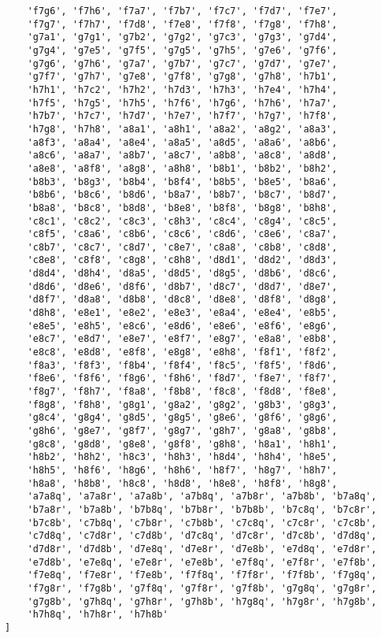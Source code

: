\begin{verbatim}
    'f7g6', 'f7h6', 'f7a7', 'f7b7', 'f7c7', 'f7d7', 'f7e7',
    'f7g7', 'f7h7', 'f7d8', 'f7e8', 'f7f8', 'f7g8', 'f7h8',
    'g7a1', 'g7g1', 'g7b2', 'g7g2', 'g7c3', 'g7g3', 'g7d4',
    'g7g4', 'g7e5', 'g7f5', 'g7g5', 'g7h5', 'g7e6', 'g7f6',
    'g7g6', 'g7h6', 'g7a7', 'g7b7', 'g7c7', 'g7d7', 'g7e7',
    'g7f7', 'g7h7', 'g7e8', 'g7f8', 'g7g8', 'g7h8', 'h7b1',
    'h7h1', 'h7c2', 'h7h2', 'h7d3', 'h7h3', 'h7e4', 'h7h4',
    'h7f5', 'h7g5', 'h7h5', 'h7f6', 'h7g6', 'h7h6', 'h7a7',
    'h7b7', 'h7c7', 'h7d7', 'h7e7', 'h7f7', 'h7g7', 'h7f8',
    'h7g8', 'h7h8', 'a8a1', 'a8h1', 'a8a2', 'a8g2', 'a8a3',
    'a8f3', 'a8a4', 'a8e4', 'a8a5', 'a8d5', 'a8a6', 'a8b6',
    'a8c6', 'a8a7', 'a8b7', 'a8c7', 'a8b8', 'a8c8', 'a8d8',
    'a8e8', 'a8f8', 'a8g8', 'a8h8', 'b8b1', 'b8b2', 'b8h2',
    'b8b3', 'b8g3', 'b8b4', 'b8f4', 'b8b5', 'b8e5', 'b8a6',
    'b8b6', 'b8c6', 'b8d6', 'b8a7', 'b8b7', 'b8c7', 'b8d7',
    'b8a8', 'b8c8', 'b8d8', 'b8e8', 'b8f8', 'b8g8', 'b8h8',
    'c8c1', 'c8c2', 'c8c3', 'c8h3', 'c8c4', 'c8g4', 'c8c5',
    'c8f5', 'c8a6', 'c8b6', 'c8c6', 'c8d6', 'c8e6', 'c8a7',
    'c8b7', 'c8c7', 'c8d7', 'c8e7', 'c8a8', 'c8b8', 'c8d8',
    'c8e8', 'c8f8', 'c8g8', 'c8h8', 'd8d1', 'd8d2', 'd8d3',
    'd8d4', 'd8h4', 'd8a5', 'd8d5', 'd8g5', 'd8b6', 'd8c6',
    'd8d6', 'd8e6', 'd8f6', 'd8b7', 'd8c7', 'd8d7', 'd8e7',
    'd8f7', 'd8a8', 'd8b8', 'd8c8', 'd8e8', 'd8f8', 'd8g8',
    'd8h8', 'e8e1', 'e8e2', 'e8e3', 'e8a4', 'e8e4', 'e8b5',
    'e8e5', 'e8h5', 'e8c6', 'e8d6', 'e8e6', 'e8f6', 'e8g6',
    'e8c7', 'e8d7', 'e8e7', 'e8f7', 'e8g7', 'e8a8', 'e8b8',
    'e8c8', 'e8d8', 'e8f8', 'e8g8', 'e8h8', 'f8f1', 'f8f2',
    'f8a3', 'f8f3', 'f8b4', 'f8f4', 'f8c5', 'f8f5', 'f8d6',
    'f8e6', 'f8f6', 'f8g6', 'f8h6', 'f8d7', 'f8e7', 'f8f7',
    'f8g7', 'f8h7', 'f8a8', 'f8b8', 'f8c8', 'f8d8', 'f8e8',
    'f8g8', 'f8h8', 'g8g1', 'g8a2', 'g8g2', 'g8b3', 'g8g3',
    'g8c4', 'g8g4', 'g8d5', 'g8g5', 'g8e6', 'g8f6', 'g8g6',
    'g8h6', 'g8e7', 'g8f7', 'g8g7', 'g8h7', 'g8a8', 'g8b8',
    'g8c8', 'g8d8', 'g8e8', 'g8f8', 'g8h8', 'h8a1', 'h8h1',
    'h8b2', 'h8h2', 'h8c3', 'h8h3', 'h8d4', 'h8h4', 'h8e5',
    'h8h5', 'h8f6', 'h8g6', 'h8h6', 'h8f7', 'h8g7', 'h8h7',
    'h8a8', 'h8b8', 'h8c8', 'h8d8', 'h8e8', 'h8f8', 'h8g8',
    'a7a8q', 'a7a8r', 'a7a8b', 'a7b8q', 'a7b8r', 'a7b8b', 'b7a8q',
    'b7a8r', 'b7a8b', 'b7b8q', 'b7b8r', 'b7b8b', 'b7c8q', 'b7c8r',
    'b7c8b', 'c7b8q', 'c7b8r', 'c7b8b', 'c7c8q', 'c7c8r', 'c7c8b',
    'c7d8q', 'c7d8r', 'c7d8b', 'd7c8q', 'd7c8r', 'd7c8b', 'd7d8q',
    'd7d8r', 'd7d8b', 'd7e8q', 'd7e8r', 'd7e8b', 'e7d8q', 'e7d8r',
    'e7d8b', 'e7e8q', 'e7e8r', 'e7e8b', 'e7f8q', 'e7f8r', 'e7f8b',
    'f7e8q', 'f7e8r', 'f7e8b', 'f7f8q', 'f7f8r', 'f7f8b', 'f7g8q',
    'f7g8r', 'f7g8b', 'g7f8q', 'g7f8r', 'g7f8b', 'g7g8q', 'g7g8r',
    'g7g8b', 'g7h8q', 'g7h8r', 'g7h8b', 'h7g8q', 'h7g8r', 'h7g8b',
    'h7h8q', 'h7h8r', 'h7h8b'
]


\end{verbatim}
